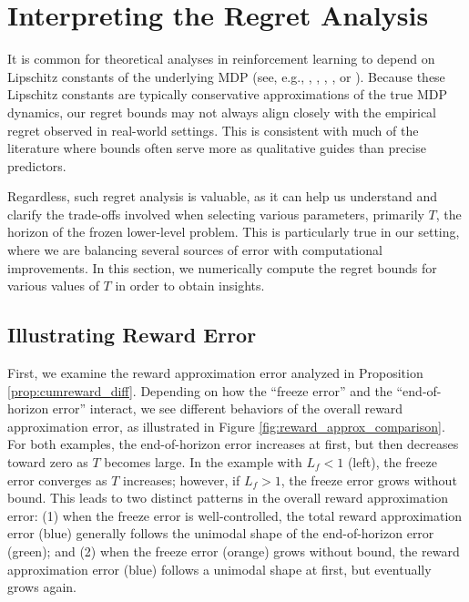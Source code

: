\documentclass[11pt, notitlepage]{article}
\newcommand{\1}{\mathbbm{1}}
\begin{document}
\section{Interpreting the Regret Analysis}
\label{sec:interpreting}
It is common for theoretical analyses in reinforcement learning to depend on Lipschitz constants of the underlying MDP (see, e.g., \cite{pirotta2015policy}, \cite{asadi2018lipschitz}, \cite{gelada2019deepmdp}, \cite{sinclair2022adaptive}, or \cite{maran2024no}). Because these Lipschitz constants are typically conservative approximations of the true MDP dynamics, our regret bounds may not always align closely with the empirical regret observed in real-world settings. This is consistent with much of the literature where bounds often serve more as qualitative guides than precise predictors.

Regardless, such regret analysis is valuable, as it can help us understand and clarify the trade-offs involved when selecting various parameters, primarily $T$, the horizon of the frozen lower-level problem. This is particularly true in our setting, where we are balancing several sources of error with computational improvements. In this section, we numerically compute the regret bounds for various values of $T$ in order to obtain insights.

\subsection{Illustrating Reward Error}

First, we examine the reward approximation error analyzed in Proposition \ref{prop:cumreward_diff}. Depending on how the ``freeze error'' and the ``end-of-horizon error'' interact, we see different behaviors of the overall reward approximation error, as illustrated in Figure \ref{fig:reward_approx_comparison}. For both examples, the end-of-horizon error increases at first, but then decreases toward zero as $T$ becomes large. In the example with $L_f < 1$ (left), the freeze error converges as $T$ increases; however, if $L_f > 1$, the freeze error grows without bound. This leads to two distinct patterns in the overall reward approximation error: (1) when the freeze error is well-controlled, the total reward approximation error (blue) generally follows the unimodal shape of the end-of-horizon error (green); and (2) when the freeze error (orange) grows without bound, the reward approximation error (blue) follows a unimodal shape at first, but eventually grows again.
\end{document}
